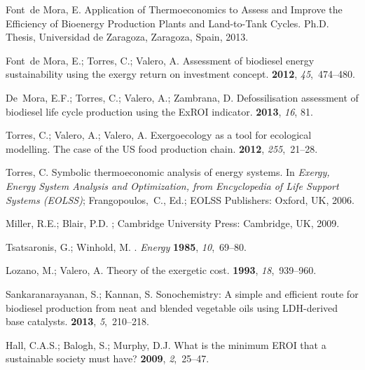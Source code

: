 \documentclass[sustainability,article,accept,moreauthors,pdftex,12pt,a4paper]{mdpi}
\begin{document}
\begin{thebibliography}{----}
Font~de Mora, E.
\newblock Application of Thermoeconomics to Assess and Improve the Efficiency of Bioenergy Production Plants and Land-to-Tank Cycles.
\newblock Ph.D. Thesis, Universidad de Zaragoza, Zaragoza, Spain, 2013.

Font~de Mora, E.; Torres, C.; Valero, A.
\newblock Assessment of biodiesel energy sustainability using the exergy return on investment concept.
 {\bf 2012}, {\em 45},~474--480.

De~Mora, E.F.; Torres, C.; Valero, A.; Zambrana, D.
\newblock Defossilisation assessment of biodiesel life cycle production using the ExROI indicator.
 {\bf 2013}, {\em 16}, 81.

Torres, C.; Valero, A.; Valero, A.
\newblock Exergoecology as a tool for ecological modelling. The case of the US food production chain.
 {\bf 2012}, {\em 255},~21--28.

Torres, C.
\newblock Symbolic thermoeconomic analysis of energy systems. In {\em Exergy, Energy System Analysis and Optimization, from Encyclopedia of Life Support Systems (EOLSS)}; \mbox{Frangopoulos, C.,} Ed.; EOLSS Publishers: Oxford, UK, 2006.

Miller, R.E.; Blair, P.D.
; Cambridge
 University Press: Cambridge, UK, 2009.

Tsatsaronis, G.; Winhold, M.
.
{\em Energy} {\bf 1985}, {\em 10},~{69--80}.

Lozano, M.; Valero, A.
\newblock Theory of the exergetic cost.
 {\bf 1993}, {\em 18},~939--960.

Sankaranarayanan, S.; Kannan, S.
\newblock Sonochemistry: A simple and efficient route for biodiesel production
  from neat and blended vegetable oils using LDH-derived base catalysts.
 {\bf 2013}, {\em 5},~210--218.

Hall, C.A.S.; Balogh, S.; Murphy, D.J.
\newblock What is the minimum EROI that a sustainable society must have?
 {\bf 2009}, {\em 2},~25--47.

\end{thebibliography}
\end{document}
